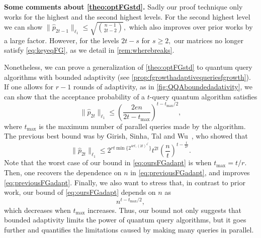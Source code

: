 \documentclass[11pt]{article}
\newcommand{\norm}[1]{\|#1\|}
\newcommand{\1}{\mathbf{1}}
\theoremstyle{plain}
\theoremstyle{definition}
\theoremstyle{remark}
\begin{document}
\vspace{0.3cm}
\noindent\textbf{Some comments about \cref{theo:optFGstd}.} Sadly our proof technique only works for the highest and the second highest levels. For the second highest level we can show $\norm{\widehat p_{2t-1}}_{\ell_1}\leq \sqrt{{n-1\choose 2t-2}},$ which also improves over prior works by a large factor. However, for the levels $2t-s$ for $s\geq 2,$ our matrices no longer satisfy \cref{eq:keyeqFG}, as we detail in \cref{rem:wherebreaks}. 

Nonetheless, we can prove a generalization of \cref{theo:optFGstd} to quantum query algorithms with bounded adaptivity (see \cref{prop:fgrowthadaptivequeriesfgrowth}). If one allows for $r-1$ rounds of adaptivity, as in \cref{fig:QQAboundedadativity}, we can show that the acceptance probability of a $t$-query quantum algorithm satisfies 
\begin{equation}\label{eq:oursFGadapt}
    \norm{\widehat p_{2t}}_{\ell_1}\leq \left(\frac{2en}{2t-t_{\max}}\right)^{t-t_{\max}/2},
\end{equation}
where $t_{\max}$ is the maximum number of parallel queries made by the algorithm. The previous best bound was by Girish, Sinha, Tal and  Wu~\cite[Corollary 4.2]{girish2024power}, who showed that 
\begin{equation}\label{eq:previousFGadapt}
    \norm{\widehat p_{2t}}_{\ell_1}\leq 2^{rt\min\{2^{4rt,(2t)^{4^r}}\}}t^{2t}\left(\frac{n}{t}\right)^{t-\frac{t}{2r}}.
\end{equation}
Note that the worst case of our bound in \cref{eq:oursFGadapt} is when $t_{\max}=t/r.$ Then, one recovers the dependence on $n$ in \cref{eq:previousFGadapt}, and improves \cref{eq:previousFGadapt}.
Finally, we also want to stress that, in contrast to prior work, our bound of \cref{eq:oursFGadapt} depends on $n$ as 
\begin{equation*}
    n^{t-t_{\max}/2},
\end{equation*}
which decreases when $t_{\max}$ increases. Thus, our bound not only suggests that bounded adaptivity limits the power of quantum query algorithms, but it goes further and quantifies the limitations caused by making many queries in parallel. 
\end{document}
